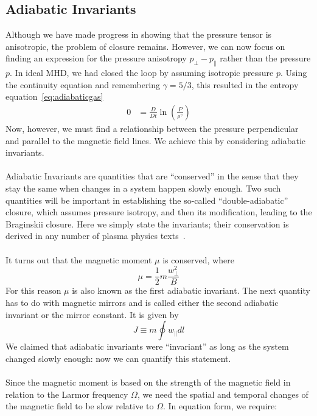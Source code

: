 \subsection{Adiabatic Invariants}\label{ssec:adiabaticinvariants}
Although we have made progress in showing that the pressure tensor is anisotropic, the problem of closure remains. However, we can now focus on finding an expression for the pressure anisotropy $p_\perp-p_\parallel$ rather than the pressure $p$. In ideal MHD, we had closed the loop by assuming isotropic pressure $p$. Using the continuity equation and remembering $\gamma=5/3$, this resulted in the entropy equation~\ref{eq:adiabaticgas}
\begin{align*}
  0&=\frac{D}{Dt}\ln\left(\frac{P}{\rho^\gamma}\right)
\end{align*}
Now, however, we must find a relationship between the pressure perpendicular and parallel to the magnetic field lines. We achieve this by considering adiabatic invariants.\\
\\
Adiabatic Invariants are quantities that are ``conserved'' in the sense that they stay the same when changes in a system happen slowly enough. Two such quantities will be important in establishing the so-called ``double-adiabatic'' closure, which assumes pressure isotropy, and then its modification, leading to the Braginskii closure. Here we simply state the invariants; their conservation is derived in any number of plasma physics texts~\cite{Nicholson1983}.\\
\\
It turns out that the magnetic moment $\mu$ is conserved, where
\begin{equation*}
  \mu=\frac12m\frac{w_\perp^2}{B}
\end{equation*}
For this reason $\mu$ is also known as the first adiabatic invariant. The next quantity has to do with magnetic mirrors and is called either the second adiabatic invariant or the mirror constant. It is given by
\begin{equation*}
  J\equiv m\oint w_\parallel dl
\end{equation*}
We claimed that adiabatic invariants were ``invariant'' as long as the system changed slowly enough: now we can quantify this statement. \\
\\
Since the magnetic moment is based on the strength of the magnetic field in relation to the Larmor frequency $\Omega$, we need the spatial and temporal changes of the magnetic field to be slow relative to $\Omega$. In equation form, we require:
